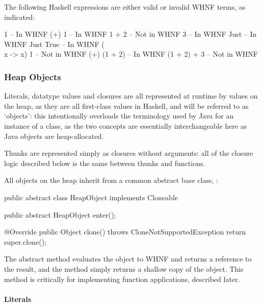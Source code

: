 \documentclass[dissertation.tex]{subfiles}
\begin{document}
{{{            The following Haskell expressions are either valid or invalid WHNF terms, as indicated:

            \begin{haskellfigure}
            1               -- In WHNF
            (+) 1           -- In WHNF
            1 + 2           -- Not in WHNF
            3               -- In WHNF
            Just            -- In WHNF
            Just True       -- In WHNF
            (\\x -> x) 1    -- Not in WHNF
            (+) (1 + 2)     -- In WHNF
            (1 + 2) + 3     -- Not in WHNF
            \end{haskellfigure}
        }
        \subsubsection{Heap Objects}
        {

            Literals, datatype values and closures are all represented at runtime by values on the heap, as they are all
            first-class values in Haskell, and will be referred to as `objects': this intentionally overloads the
            terminology used by Java for an instance of a class, as the two concepts are essentially interchangeable
            here as Java objects are heap-allocated.

            Thunks are represented simply as closures without arguments: all of the closure logic described below is the
            same between thunks and functions.

            All objects on the heap inherit from a common abstract base class, :

            \begin{javafigure}
            public abstract class HeapObject implements Cloneable {
                public abstract HeapObject enter();

                @Override
                public Object clone() throws CloneNotSupportedException {
                    return super.clone();
                }
            }
            \end{javafigure}

            The abstract  method evaluates the object to WHNF and returns a reference to the result, and the
             method simply returns a shallow copy of the object. This method is critically for implementing
            function applications, described later.

            \paragraph*{Literals}\label{sec:literals}
            {
                
}}}}
\end{document}

